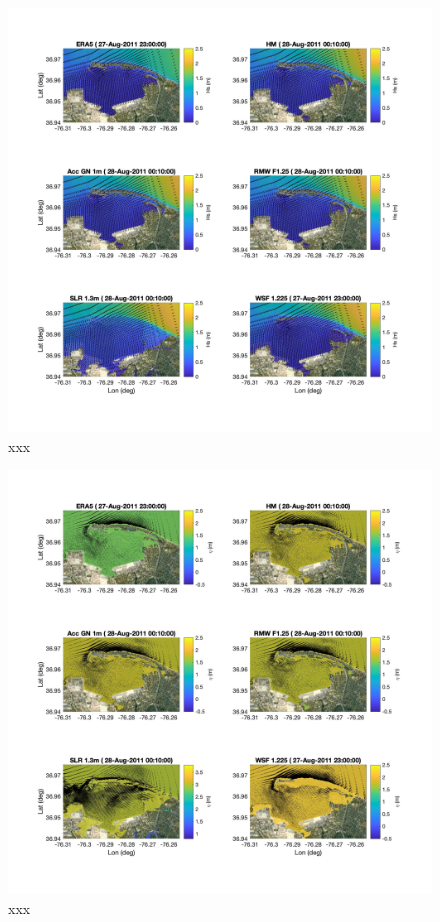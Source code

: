 \documentclass[preprint,12pt,authoryear]{elsarticle}
\begin{document}
\begin{figure}
\centering
\includegraphics[width=\textwidth]{./figures/nearcom_hs.jpg}
\caption{xxx }
\label{boundary}
\centering
\end{figure}

\begin{figure}
\centering
\includegraphics[width=\textwidth]{./figures/nearcom_eta_uv.jpg}
\caption{xxx }
\label{boundary}
\centering
\end{figure}
\end{document}
